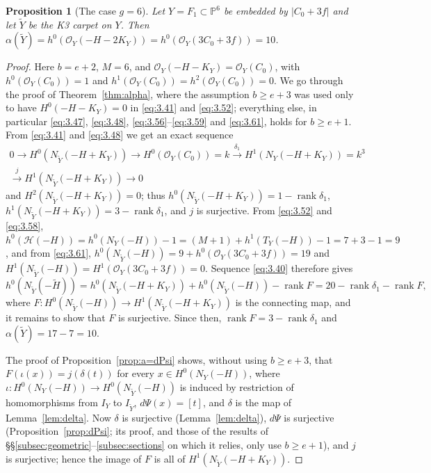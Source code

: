 \documentclass[11pt,twoside]{amsart}
\theoremstyle{plain}
\newtheorem{proposition}[theorem]{Proposition}
\theoremstyle{definition}
\newcommand{\PP}{\mathbb{P}}
\newcommand{\OO}{\mathcal{O}}
\newcommand{\Yt}{\widetilde{Y}}
\newcommand{\Ht}{\widetilde{H}}
\newcommand{\NY}{N_{Y}}
\newcommand{\NYt}{N_{\Yt}}
\newcommand{\Hc}{\mathcal{H}}
\begin{document}
\begin{proposition}[The case $g=6$]\label{prop:g6}
Let $Y=F_1\subset\PP^6$ be embedded by $|C_0+3f|$ and let $\Yt$ be the K3 carpet on $Y$. Then $\alpha(\Yt)=h^0(\OO_Y(-H-2K_Y))=h^0(\OO_Y(3C_0+3f))=10$.
\end{proposition}

\begin{proof}
Here $b=e+2$, $M=6$, and $\OO_Y(-H-K_Y)=\OO_Y(C_0)$, with $h^0(\OO_Y(C_0))=1$ and $h^1(\OO_Y(C_0))=h^2(\OO_Y(C_0))=0$. We go through the proof of Theorem~\ref{thm:alpha}, where the assumption $b\ge e+3$ was used only to have $H^0(-H-K_Y)=0$ in \eqref{eq:3.41} and \eqref{eq:3.52}; everything else, in particular \eqref{eq:3.47}, \eqref{eq:3.48}, \eqref{eq:3.56}--\eqref{eq:3.59} and \eqref{eq:3.61}, holds for $b\ge e+1$. From \eqref{eq:3.41} and \eqref{eq:3.48} we get an exact sequence
\begin{multline*}
0\to H^0(\NYt(-H+K_Y))\to H^0(\OO_Y(C_0))=k\xrightarrow{\ \delta_1\ }H^1(\NY(-H+K_Y))=k^3\\
\xrightarrow{\ j\ }H^1(\NYt(-H+K_Y))\to0
\end{multline*}
and $H^2(\NYt(-H+K_Y))=0$; thus $h^0(\NYt(-H+K_Y))=1-\operatorname{rank}\delta_1$, $h^1(\NYt(-H+K_Y))=3-\operatorname{rank}\delta_1$, and $j$ is surjective. From \eqref{eq:3.52} and \eqref{eq:3.58}, $h^0(\Hc(-H))=h^0(\NY(-H))-1=(M+1)+h^1(T_Y(-H))-1=7+3-1=9$, and from \eqref{eq:3.61}, $h^0(\NYt(-H))=9+h^0(\OO_Y(3C_0+3f))=19$ and $H^1(\NYt(-H))=H^1(\OO_Y(3C_0+3f))=0$. Sequence \eqref{eq:3.40} therefore gives
\[
h^0(\NYt(-\Ht))=h^0(\NYt(-H+K_Y))+h^0(\NYt(-H))-\operatorname{rank}F=20-\operatorname{rank}\delta_1-\operatorname{rank}F,
\]
where $F\colon H^0(\NYt(-H))\to H^1(\NYt(-H+K_Y))$ is the connecting map, and it remains to show that $F$ is surjective. Since then, $\operatorname{rank}F=3-\operatorname{rank}\delta_1$ and $\alpha(\Yt)=17-7=10$.

The proof of Proposition~\ref{prop:a=dPsi} shows, without using $b\ge e+3$, that $F(\iota(x))=j(\delta(t))$ for every $x\in H^0(\NY(-H))$, where $\iota\colon H^0(\NY(-H))\to H^0(\NYt(-H))$ is induced by restriction of homomorphisms from $I_Y$ to $I_{\Yt}$, $d\Psi(x)=[t]$, and $\delta$ is the map of Lemma~\ref{lem:delta}. Now $\delta$ is surjective (Lemma~\ref{lem:delta}), $d\Psi$ is surjective (Proposition~\ref{prop:dPsi}; its proof, and those of the results of \S\S\ref{subsec:geometric}--\ref{subsec:sections} on which it relies, only use $b\ge e+1$), and $j$ is surjective; hence the image of $F$ is all of $H^1(\NYt(-H+K_Y))$.
\end{proof}
\end{document}
